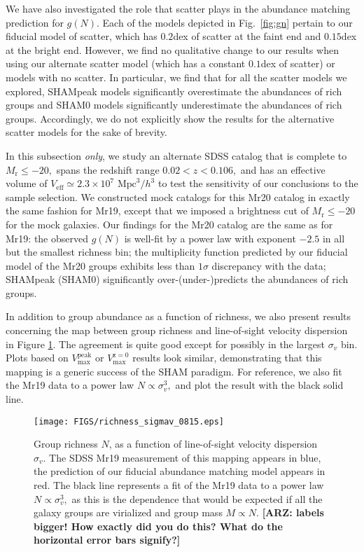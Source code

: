 \documentclass[usenatbib,usegraphicx,letterpaper]{mn2e}
\newcommand{\vpeak}{V_{\mathrm{max}}^{\mathrm{peak}}}
\newcommand{\vzero}{V_{\mathrm{max}}^{\mathrm{z=0}}}
\newcommand{\mr}{M_{\mathrm{r}}}
\newcommand{\veff}{V_{\mathrm{eff}}}
\begin{document}
We have also investigated the role that scatter plays in the abundance matching 
prediction for $g(N).$ Each of the models depicted in Fig.~\ref{fig:gn} pertain 
to our fiducial model of scatter, which has $0.2$dex of scatter at the faint end 
and $0.15$dex at the bright end. However, we find no qualitative change to our results 
when using our alternate scatter model (which has a constant $0.1$dex of scatter) 
or models with no scatter. In particular, we find that for all the scatter models 
we explored, SHAMpeak models significantly overestimate the abundances of rich groups 
and SHAM0 models significantly underestimate the abundances of rich groups. 
Accordingly, we do not explicitly show the results for the alternative scatter models 
for the sake of brevity.  

In this subsection {\em only}, we study an alternate SDSS catalog that is 
complete to $\mr\leq-20,$ spans the redshift range $0.02<z<0.106,$ and has an 
effective volume of $\veff \simeq 2.3\times10^{7}$ $\mathrm{Mpc}^{3}/h^3$ to 
test the sensitivity of our conclusions to the sample selection. 
We constructed mock catalogs for this Mr20 catalog in exactly the same fashion 
for Mr19, except that we imposed a brightness cut of $\mr\leq-20$ for the mock galaxies. 
Our findings for the Mr20 catalog are the same as for Mr19: 
the observed $g(N)$ is well-fit by a power law with exponent $-2.5$ in all but 
the smallest richness bin; 
the multiplicity function predicted by our fiducial model of the Mr20 groups 
exhibits less than $1\sigma$ discrepancy with the data; 
SHAMpeak (SHAM0) significantly over-(under-)predicts the abundances of rich groups. 



In addition to group abundance as a function of richness, 
we also present results concerning the map between group richness 
and line-of-sight velocity dispersion in Figure \ref{fig:sigmavn}.  
The agreement is quite good except for possibly in the largest $\sigma_v$ bin. 
Plots based on $\vpeak$ or $\vzero$ results look similar, demonstrating that 
this mapping is a generic success of the SHAM paradigm. For reference, we also 
fit the Mr19 data to a power law $N\propto\sigma_{v}^{3},$ and plot the result with 
the black solid line.

\begin{figure}
\centering
\texttt{[image: FIGS/richness\_sigmav\_0815.eps]}
\caption{
Group richness $N$, as a function of line-of-sight velocity 
dispersion $\sigma_v.$ The SDSS Mr19 measurement of this mapping appears 
in blue, the prediction of our fiducial abundance matching model appears 
in red. The black line represents a fit of the Mr19 data to a power 
law $N\propto\sigma_{v}^{3},$ as this is the dependence that would be 
expected if all the galaxy groups are virialized and group mass 
$M\propto N.$ {\bf [ARZ: labels bigger! How exactly did you do this?  What do 
the horizontal error bars signify?]}
}
\label{fig:sigmavn}
\end{figure}
\end{document}
